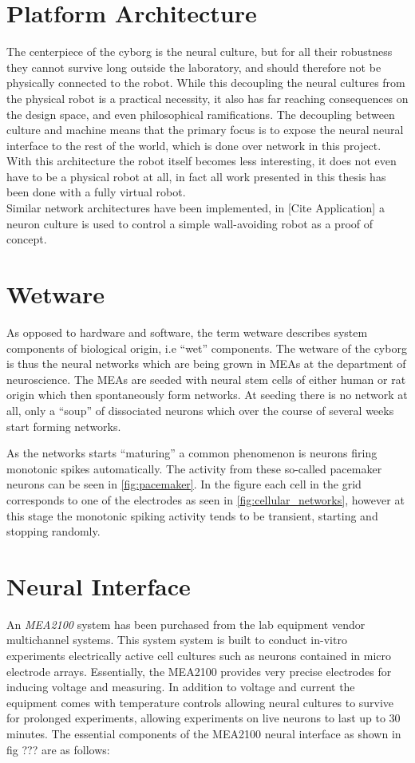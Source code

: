 \section{Platform Architecture}
The centerpiece of the cyborg is the neural culture, but for all their
robustness they cannot survive long outside the laboratory, and should therefore
not be physically connected to the robot.
While this decoupling the neural cultures from the physical robot is a practical
necessity, it also has far reaching consequences on the design space, and even
philosophical ramifications.
The decoupling between culture and machine means that the primary focus is to
expose the neural neural interface to the rest of the world, which is done over
network in this project.
With this architecture the robot itself becomes less interesting, it does not
even have to be a physical robot at all, in fact all work presented in this
thesis has been done with a fully virtual robot.\\
Similar network architectures have been implemented, in [Cite Application] a
neuron culture is used to control a simple wall-avoiding robot as a proof of
concept.
\section{Wetware}
As opposed to hardware and software, the term wetware describes system
components of biological origin, i.e ``wet'' components.
The wetware of the cyborg is thus the neural networks which are being grown in
MEAs at the department of neuroscience.
The MEAs are seeded with neural stem cells of either human or rat origin which
then spontaneously form networks.
At seeding there is no network at all, only a ``soup'' of dissociated
neurons which over the course of several weeks start forming networks.

As the networks starts ``maturing'' a common phenomenon is neurons firing
monotonic spikes automatically.
The activity from these so-called pacemaker neurons can be seen in
\ref{fig:pacemaker}.
In the figure each cell in the grid corresponds to one of the
electrodes as seen in \ref{fig:cellular_networks}, however at this stage the
monotonic spiking activity tends to be transient, starting and stopping
randomly.

\section{Neural Interface}
An \textit{MEA2100} system has been purchased from the lab equipment vendor
multichannel systems.
This system system is built to conduct in-vitro experiments electrically active
cell cultures such as neurons contained in micro electrode arrays.
Essentially, the MEA2100 provides very precise electrodes for inducing voltage
and measuring.
In addition to voltage and current the equipment comes with temperature controls
allowing neural cultures to survive for prolonged experiments, allowing
experiments on live neurons to last up to 30 minutes.
The essential components of the MEA2100 neural interface as shown in fig ??? are
as follows:


